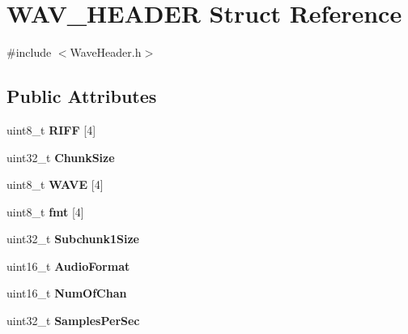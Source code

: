 \hypertarget{structWAV__HEADER}{}\section{W\+A\+V\+\_\+\+H\+E\+A\+D\+ER Struct Reference}
\label{structWAV__HEADER}


{\ttfamily \#include $<$Wave\+Header.\+h$>$}

\subsection*{Public Attributes}
\begin{DoxyCompactItemize}
\item 
\mbox{\label{structWAV__HEADER_a55f658a3251f57fce065d70b49674aca}} 
uint8\+\_\+t {\bfseries R\+I\+FF} \mbox{[}4\mbox{]}
\item 
\mbox{\label{structWAV__HEADER_ae62522c0ffb2e00012e139c8ad257e75}} 
uint32\+\_\+t {\bfseries Chunk\+Size}
\item 
\mbox{\label{structWAV__HEADER_a71254eeefd2b59351ddf0f5112bc775d}} 
uint8\+\_\+t {\bfseries W\+A\+VE} \mbox{[}4\mbox{]}
\item 
\mbox{\label{structWAV__HEADER_a819430d936a6432f035f6463101d1747}} 
uint8\+\_\+t {\bfseries fmt} \mbox{[}4\mbox{]}
\item 
\mbox{\label{structWAV__HEADER_ab31397fc6ca909c96a47138d4757805b}} 
uint32\+\_\+t {\bfseries Subchunk1\+Size}
\item 
\mbox{\label{structWAV__HEADER_ae9311db7532e5afe228fd9b0877a531e}} 
uint16\+\_\+t {\bfseries Audio\+Format}
\item 
\mbox{\label{structWAV__HEADER_a3a61c0b4f132984a023e3e73701cfc13}} 
uint16\+\_\+t {\bfseries Num\+Of\+Chan}
\item 
\mbox{\label{structWAV__HEADER_ad1511857028f0a1b5dc7f6614481c18b}} 
uint32\+\_\+t {\bfseries Samples\+Per\+Sec}
\item 
\mbox{\label{structWAV__HEADER_accb4c88131a40690f2dc4c96f71af98b}} 

\end{DoxyCompactItemize}
